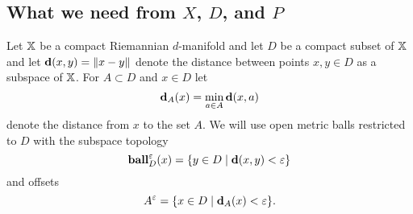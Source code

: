 
%


\subsection{What we need from $X$, $D$, and $P$}

Let $\mathbb{X}$ be a compact Riemannian $d$-manifold and let $D$ be a compact subset of $\mathbb{X}$ and let $\mathbf{d}(x, y) = \|x - y\|$ denote the distance between points $x,y\in D$ as a subspace of $\mathbb{X}$.
For $A\subset D$ and $x\in D$ let
\[\mathbf{d}_A(x) = \min_{a\in A}\mathbf{d}(x, a)\]
denote the distance from $x$ to the set $A$.
We will use open metric balls restricted to $D$ with the subspace topology
\[\mathbf{ball}_D^\varepsilon(x) = \{y\in D\mid \mathbf{d}(x, y) < \varepsilon\}\]
and offsets
\[A^\varepsilon = \{x\in D\mid \mathbf{d}_A(x) < \varepsilon\}.\]

